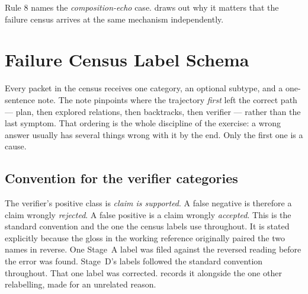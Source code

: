 Rule 8 names the \emph{composition-echo} case.  draws out why it
matters that the failure census arrives at the same mechanism independently.

\section{Failure Census Label Schema}\label{app:census-schema}

Every packet in the census receives one \textsf{category}, an optional
\textsf{subtype}, and a one-sentence note. The note pinpoints where the
trajectory \emph{first} left the correct path --- plan, then explored relations,
then backtracks, then verifier --- rather than the last symptom. That ordering
is the whole discipline of the exercise: a wrong answer usually has several
things wrong with it by the end. Only the first one is a cause.

\subsection*{Convention for the verifier categories}

The verifier's positive class is \emph{claim is supported}. A false negative is
therefore a claim wrongly \emph{rejected}. A false positive is a claim
wrongly \emph{accepted}. This is the standard convention and the one the census
labels use throughout. It is stated explicitly because the gloss in the working
reference originally paired the two names in reverse. One Stage~A label was
filed against the reversed reading before the error was found. Stage~D's labels
followed the standard convention throughout. That one label was corrected.
 records it alongside the one other relabelling,
made for an unrelated reason.

